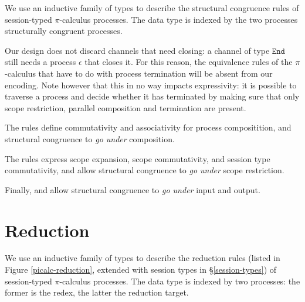 \documentclass{mproj}
\newcommand{\picalc}{$\pi$-calculus}
\newcommand{\type}{\texttt}
\newcommand{\End}{\type{End}}
\begin{document}
We use an inductive family of types to describe the structural congruence rules of session-typed \picalc{} processes. The data type is indexed by the two processes structurally congruent processes.


Our design does not discard channels that need closing: a channel of type $\End$ still needs a process $\epsilon$ that closes it. For this reason, the equivalence rules of the \picalc{} that have to do with process termination will be absent from our encoding. Note however that this in no way impacts expressivity: it is possible to traverse a process and decide whether it has terminated by making sure that only scope restriction, parallel composition and termination are present.

The  rules define commutativity and associativity for process compositition, and structural congruence to \emph{go under} composition.


The  rules express scope expansion, scope commutativity, and session type commutativity, and allow structural congruence to \emph{go under} scope restriction.


Finally,  and  allow structural congruence to \emph{go under} input and output.



\section{Reduction}\label{reduction}

We use an inductive family of types to describe the reduction rules (listed in Figure \ref{picalc-reduction}, extended with session types in \S \ref{session-types}) of session-typed \picalc{} processes. The data type is indexed by two processes: the former is the redex, the latter the reduction target. 
\end{document}
